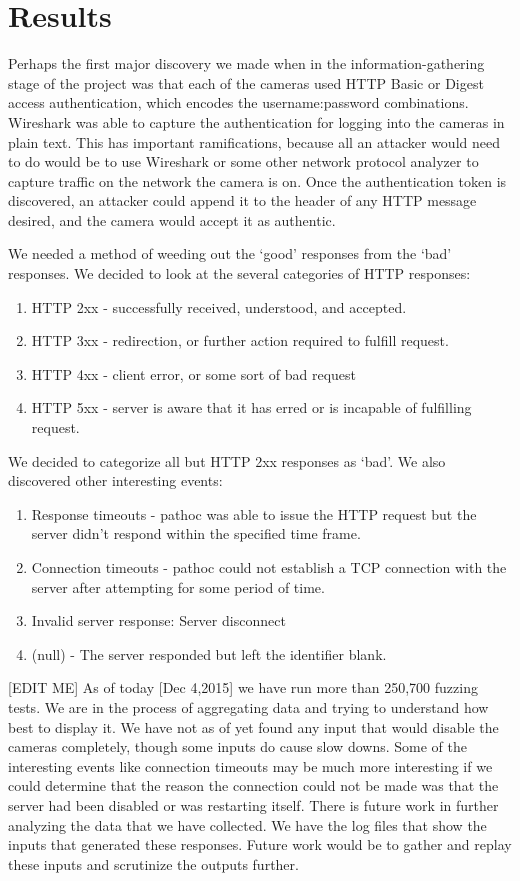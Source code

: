 \documentclass[letterpaper,twocolumn,10pt]{article}
\begin{document}
\section{Results}

Perhaps the first major discovery we made when in the information-gathering stage of the project was that each of the cameras used HTTP Basic or Digest access authentication, which encodes the username:password combinations. Wireshark was able to capture the authentication for logging into the cameras in plain text. This has important ramifications, because all an attacker would need to do would be to use Wireshark or some other network protocol analyzer to capture traffic on the network the camera is on. Once the authentication token is discovered, an attacker could append it to the header of any HTTP message desired, and the camera would accept it as authentic. 

We needed a method of weeding out the `good' responses from the `bad' responses. We decided to look at the several categories of HTTP responses: 
\begin{enumerate}
\item HTTP 2xx - successfully received, understood, and accepted.
\item HTTP 3xx - redirection, or further action required to fulfill request.
\item HTTP 4xx - client error, or some sort of bad request
\item HTTP 5xx - server is aware that it has erred or is incapable of fulfilling request.
\end{enumerate}
We decided to categorize all but HTTP 2xx responses as `bad'. We also discovered other interesting events:
\begin{enumerate}
	\item Response timeouts - pathoc was able to issue the HTTP request but the server didn't respond within the specified time frame.
	\item Connection timeouts - pathoc could not establish a TCP connection with the server after attempting for some period of time.
	\item Invalid server response: Server disconnect
	\item (null) - The server responded but left the identifier blank.
\end{enumerate}




[EDIT ME]
As of today [Dec 4,2015] we have run more than 250,700 fuzzing tests. We are in the process of aggregating data and trying to understand how best to display it. We have not as of yet found any input that would disable the cameras completely, though some inputs do cause slow downs. Some of the interesting events like connection timeouts may be much more interesting if we could determine that the reason the connection could not be made was that the server had been disabled or was restarting itself. There is future work in further analyzing the data that we have collected. We have the log files that show the inputs that generated these responses. Future work would be to gather and replay these inputs and scrutinize the outputs further. 
\end{document}
